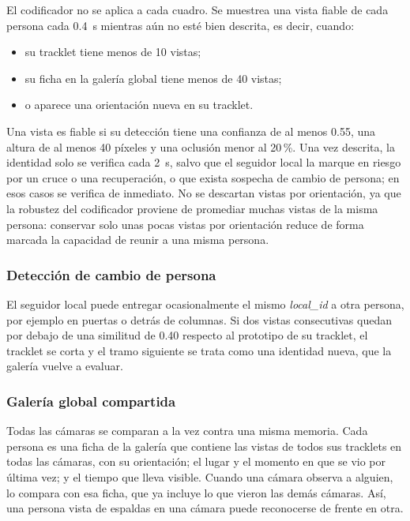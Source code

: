 \documentclass[12pt,a4paper]{article}
\begin{document}
El codificador no se aplica a cada cuadro. Se muestrea una vista fiable
de cada persona cada 0.4~s mientras aún no esté bien descrita, es decir,
cuando:

\begin{itemize}
    \item su tracklet tiene menos de 10 vistas;
    \item su ficha en la galería global tiene menos de 40 vistas;
    \item o aparece una orientación nueva en su tracklet.
\end{itemize}

Una vista es fiable si su detección tiene una confianza de al menos 0.55,
una altura de al menos 40 píxeles y una oclusión menor al 20\,\%. Una vez
descrita, la identidad solo se verifica cada 2~s, salvo que el seguidor
local la marque en riesgo por un cruce o una recuperación, o que exista
sospecha de cambio de persona; en esos casos se verifica de inmediato.
No se descartan vistas por orientación, ya que la robustez del
codificador proviene de promediar muchas vistas de la misma persona:
conservar solo unas pocas vistas por orientación reduce de forma marcada
la capacidad de reunir a una misma persona.

\subsubsection{Detección de cambio de persona}

El seguidor local puede entregar ocasionalmente el mismo
\textit{local\_id} a otra persona, por ejemplo en puertas o detrás de
columnas. Si dos vistas consecutivas quedan por debajo de una similitud
de 0.40 respecto al prototipo de su tracklet, el tracklet se corta y el
tramo siguiente se trata como una identidad nueva, que la galería vuelve
a evaluar.

\subsubsection{Galería global compartida}

Todas las cámaras se comparan a la vez contra una misma memoria. Cada
persona es una ficha de la galería que contiene las vistas de todos sus
tracklets en todas las cámaras, con su orientación; el lugar y el
momento en que se vio por última vez; y el tiempo que lleva visible.
Cuando una cámara observa a alguien, lo compara con esa ficha, que ya
incluye lo que vieron las demás cámaras. Así, una persona vista de
espaldas en una cámara puede reconocerse de frente en otra.
\end{document}
